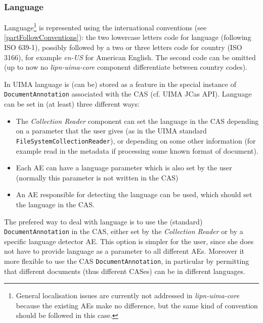 \documentclass{article}
\newenvironment{xitemize}{
\begin{itemize}
  \setlength{\itemsep}{.3\baselineskip}
  \setlength{\topsep}{0pt}
  \setlength{\parskip}{0pt}
  \setlength{\parsep}{0pt}
}{\end{itemize}}
\newcommand{\uimaModule}{{\em lipn-uima-core}\xspace}
\begin{document}
\subsubsection{Language}
\label{partLanguage}

Language\footnote{General localisation issues are currently not addressed in \uimaModule because the existing AEs make no difference, but the same kind of convention should be followed in this case.} is represented using the international conventions (see \ref{partFollowConventions}): the two lowercase letters code for language (following ISO 639-1), possibly followed by a two or three letters code for country (ISO 3166), for example {\em en-US} for American English. The second code can be omitted (up to now no \uimaModule component differentiate between country codes).

In UIMA language is (can be) stored as a feature in the special instance of {\tt DocumentAnnotation} associated with the CAS (cf. UIMA JCas API). Language can be set in (at least) three different ways: 


\begin{xitemize}
\item The {\em Collection Reader} component can set the language in the CAS depending on a parameter that the user gives (as in the UIMA standard {\tt FileSystemCollectionReader}), or depending on some other information (for example read in the metadata if processing some known format of document).
\item Each AE can have a language parameter which is also set by the user (normally this parameter is not written in the CAS)
\item An AE responsible for detecting the language can be used, which should set the language in the CAS.
\end{xitemize}

The prefered way to deal with language is to use the (standard) {\tt DocumentAnnotation} in the CAS, either set by the {\em Collection Reader} or by a specific language detector AE. This option is simpler for the user, since she does not have to provide language as a parameter to all different AEs. Moreover it more flexible to use the CAS  {\tt DocumentAnnotation}, in particular by permitting that different documents (thus different CASes) can be in different languages.
\end{document}
